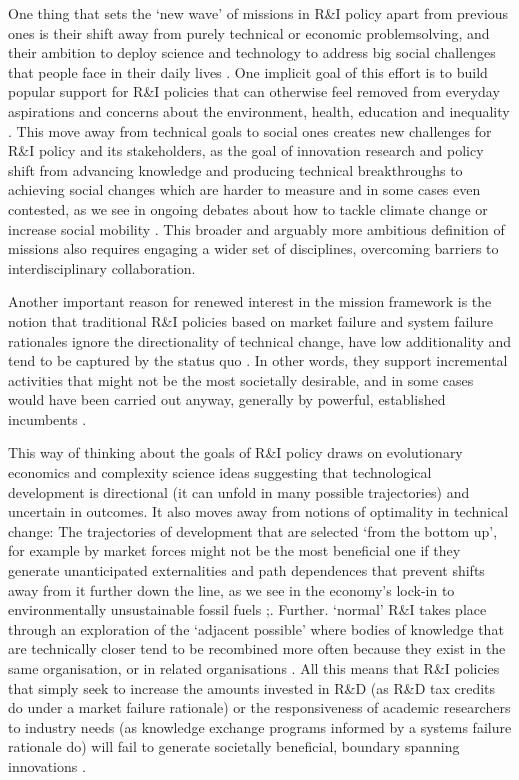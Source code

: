 \documentclass[11pt]{article}
\begin{document}
One thing that sets the `new wave' of missions in R\&I policy apart from previous ones is their shift away from purely technical or economic problem\-solving, and their ambition to deploy science and technology to address big social challenges that people face in their daily lives \citep{mazzucato_mission-oriented_2018}. One implicit goal of this effort is to build popular support for R\&I policies that can otherwise feel removed from everyday aspirations and concerns about the environment, health, education and inequality \citep{mazzucato_mission-oriented_2018}. This move away from technical goals to social ones creates new challenges for R\&I policy and its stakeholders, as the goal of innovation research and policy shift from advancing knowledge and producing technical breakthroughs to achieving social changes which are harder to measure and in some cases even contested, as we see in ongoing debates about how to tackle climate change or increase social mobility \citep{nelson_moon_2011,mowery_technology_2010}. This broader and arguably more ambitious definition of missions also requires engaging a wider set of disciplines, overcoming barriers to interdisciplinary collaboration.

Another important reason for renewed interest in the mission framework is the notion that traditional R\&I policies based on market failure and system failure rationales ignore the directionality of technical change, have low additionality and tend to be captured by the status quo \citep{cantner_elements_2018,frenken_complexity-theoretic_2017}. In other words, they support incremental activities that might not be the most societally desirable, and in some cases would have been carried out anyway, generally by powerful, established incumbents \citep{frenken_complexity-theoretic_2017}. 

This way of thinking about the goals of R\&I policy draws on evolutionary economics and complexity science ideas suggesting that technological development is directional (it can unfold in many possible trajectories) and uncertain in outcomes. It also moves away from notions of optimality in technical change: The trajectories of development that are selected ‘from the bottom up’, for example by market forces might not be the most beneficial one if they generate unanticipated externalities and path dependences that prevent shifts away from it further down the line, as we see in the economy’s lock-in to environmentally unsustainable fossil fuels \citep{aghion_science_2009,david_clio_1985,arthur1994increasing};. Further. ‘normal’ R\&I takes place through an exploration of the ‘adjacent possible’ where bodies of knowledge that are technically closer tend to be recombined more often because they exist in the same organisation, or in related organisations \citep{hidalgo2017principle}. All this means that R\&I policies that simply seek to increase the amounts invested in R&D (as R\&D tax credits do under a market failure rationale) or the responsiveness of academic researchers to industry needs (as knowledge exchange programs informed by a systems failure rationale do) will fail to generate societally beneficial, boundary spanning innovations \citep{gustafsson_failure_2011}. 
\end{document}
